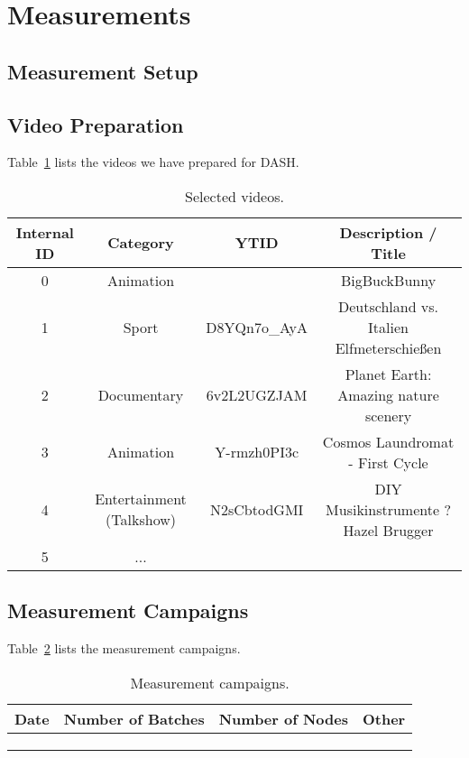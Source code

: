 
\section{Measurements}\label{sec:measurements}

\subsection{Measurement Setup}

\subsection{Video Preparation}

Table~\ref{tab:videos} lists the videos we have prepared for \ac{DASH}.

\begin{table}[h!]
\centering
\caption{Selected videos.}
\begin{tabular}{|c|c|c|c|}
\hline
\textbf{Internal ID} & \textbf{Category} & \textbf{YTID} & \textbf{Description / Title} \\
\hline
0 & Animation & & BigBuckBunny\\
\hline
1 & Sport & D8YQn7o\_AyA & Deutschland vs. Italien Elfmeterschie\ss en\\
\hline
2 & Documentary & 6v2L2UGZJAM & Planet Earth: Amazing nature scenery\\
\hline
3 & Animation & Y-rmzh0PI3c & Cosmos Laundromat - First Cycle\\
\hline
4 & Entertainment (Talkshow) & N2sCbtodGMI & DIY Musikinstrumente ? Hazel Brugger\\
\hline
5& ... & & \\
\hline
\end{tabular}
\label{tab:videos}
\end{table}

\subsection{Measurement Campaigns}

Table~\ref{tab:measurements} lists the measurement campaigns.

\begin{table}[h!]
\centering
\caption{Measurement campaigns.}
\begin{tabular}{|c|c|c|c|}
\hline
\textbf{Date} & \textbf{Number of Batches} & \textbf{Number of Nodes} & \textbf{Other} \\
\hline
&&&\\
\hline
&&&\\
\hline
&&&\\
\hline
\end{tabular}
\label{tab:measurements}
\end{table}



